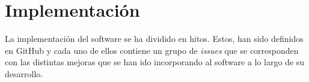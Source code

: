 \chapter{Implementación}

La implementación del software se ha dividido en hitos. Estos, han sido definidos en GitHub
y cada uno de ellos contiene un grupo de \textit{issues} que se corresponden con las distintas
mejoras que se han ido incorporando al software a lo largo de su desarrollo.
